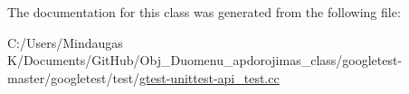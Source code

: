 The documentation for this class was generated from the following file\+:\begin{DoxyCompactItemize}
\item 
C\+:/\+Users/\+Mindaugas K/\+Documents/\+Git\+Hub/\+Obj\+\_\+\+Duomenu\+\_\+apdorojimas\+\_\+class/googletest-\/master/googletest/test/\mbox{\hyperlink{googletest-master_2googletest_2test_2gtest-unittest-api__test_8cc}{gtest-\/unittest-\/api\+\_\+test.\+cc}}\end{DoxyCompactItemize}
